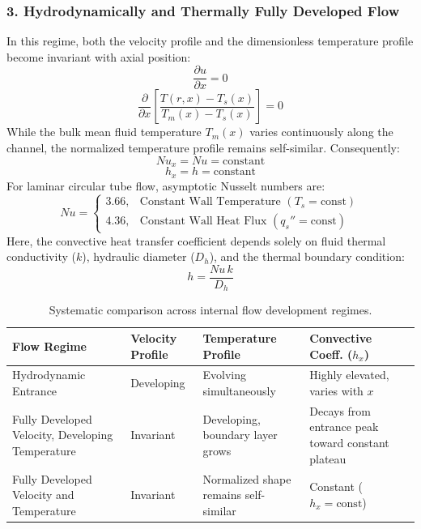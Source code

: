 \documentclass[12pt,a4paper]{report}
\begin{document}
\subsubsection{3. Hydrodynamically and Thermally Fully Developed Flow}
In this regime, both the velocity profile and the dimensionless temperature profile become invariant with axial position:
\begin{equation}
\frac{\partial u}{\partial x} = 0
\end{equation}
\begin{equation}
\frac{\partial}{\partial x} \left[ \frac{T(r,x) - T_s(x)}{T_m(x) - T_s(x)} \right] = 0
\end{equation}
While the bulk mean fluid temperature $T_m(x)$ varies continuously along the channel, the normalized temperature profile remains self-similar. Consequently:
\begin{equation}
Nu_x = Nu = \text{constant}
\end{equation}
\begin{equation}
h_x = h = \text{constant}
\end{equation}
For laminar circular tube flow, asymptotic Nusselt numbers are:
\begin{equation}
Nu = 
\begin{cases}
3.66, & \text{Constant Wall Temperature } (T_s = \text{const}) \\
4.36, & \text{Constant Wall Heat Flux } (q_s'' = \text{const})
\end{cases}
\end{equation}
Here, the convective heat transfer coefficient depends solely on fluid thermal conductivity ($k$), hydraulic diameter ($D_h$), and the thermal boundary condition:
\begin{equation}
h = \frac{Nu\,k}{D_h}
\end{equation}

\begin{table}[H]
\centering
\caption{Systematic comparison across internal flow development regimes.}
\label{tab:regimes_comp}
\begin{tabularx}{\textwidth}{p{3.5cm}p{3.5cm}p{4cm}X}
\toprule
\textbf{Flow Regime} & \textbf{Velocity Profile} & \textbf{Temperature Profile} & \textbf{Convective Coeff. ($h_x$)} \\
\midrule
Hydrodynamic Entrance & Developing & Evolving simultaneously & Highly elevated, varies with $x$ \\
\addlinespace
Fully Developed Velocity, Developing Temperature & Invariant & Developing, boundary layer grows & Decays from entrance peak toward constant plateau \\
\addlinespace
Fully Developed Velocity and Temperature & Invariant & Normalized shape remains self-similar & Constant ($h_x = \text{const}$) \\
\bottomrule
\end{tabularx}
\end{table}
\end{document}
